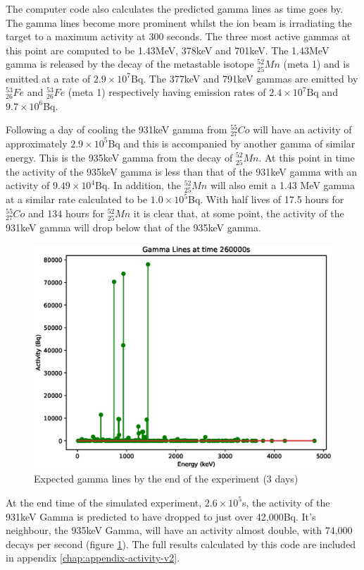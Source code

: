 The computer code also calculates the predicted gamma lines as time goes by.  The gamma lines become more prominent whilst the ion beam is irradiating the target to a maximum activity at 300 seconds.  The three most active gammas at this point are computed to be 1.43MeV, 378keV and 701keV.  The 1.43MeV gamma is released by the decay of the metastable isotope ${}^{52}_{25}Mn$ (meta 1) and is emitted at a rate of $2.9 \times 10^7$Bq.  The 377keV and 791keV gammas are emitted by ${}^{53}_{26}Fe$ and ${}^{53}_{26}Fe$ (meta 1) respectively having emission rates of $2.4 \times 10^7$Bq and $9.7 \times 10^{6}$Bq.

Following a day of cooling the 931keV gamma from ${}^{55}_{27}Co$ will have an activity of approximately $2.9 \times 10^5$Bq and this is accompanied by another gamma of similar energy.  This is the 935keV gamma from the decay of ${}^{52}_{25}Mn$.  At this point in time the activity of the 935keV gamma is less than that of the 931keV gamma with an activity of $9.49 \times 10^4$Bq.  In addition, the ${}^{52}_{25} Mn$ will also emit a 1.43 MeV gamma at a similar rate calculated to be $1.0 \times 10^5$Bq.  With half lives of 17.5 hours for ${}^{55}_{27} Co$ and 134 hours for ${}^{52}_{25} Mn$ it is clear that, at some point, the activity of the 931keV gamma will drop below that of the 935keV gamma.

\FloatBarrier
\begin{figure}[!htb]
\centering
\includegraphics[width=0.6\linewidth]{chapters/activity_code/fe-activity-v2/gammas/0300_260000.eps}
\caption{Expected gamma lines by the end of the experiment (3 days)}
\label{fig:act2totalactivity}
\end{figure}

At the end time of the simulated experiment, $2.6 \times 10^5$s, the activity of the 931keV Gamma is predicted to have dropped to just over 42,000Bq.  It's neighbour, the 935keV Gamma, will have an activity almost double, with 74,000 decays per second (figure \ref{fig:act2totalactivity}).  The full results calculated by this code are included in appendix \ref{chap:appendix-activity-v2}.  

